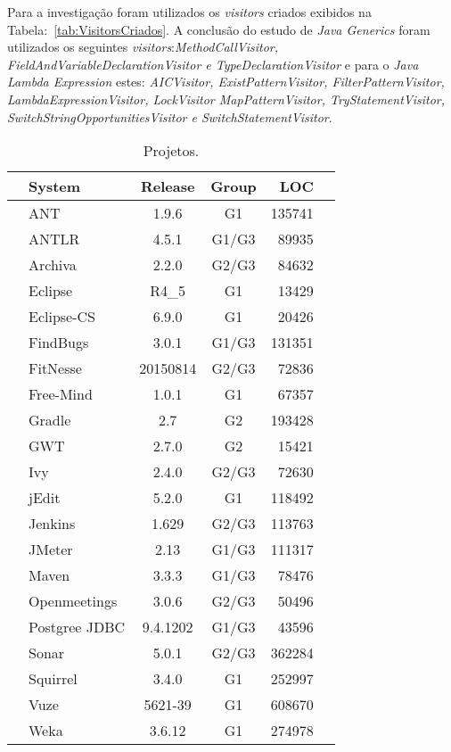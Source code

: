Para a investigação foram utilizados os \textit{visitors} criados exibidos na  Tabela:~\ref{tab:VisitorsCriados}. A conclusão do estudo de \textit{Java Generics} foram utilizados os seguintes \textit{visitors}:\textit{MethodCallVisitor, FieldAndVariableDeclarationVisitor e TypeDeclarationVisitor} e para o \textit{Java Lambda Expression} estes: \textit{AICVisitor, ExistPatternVisitor, FilterPatternVisitor, LambdaExpressionVisitor, LockVisitor  MapPatternVisitor, TryStatementVisitor, SwitchStringOpportunitiesVisitor e SwitchStatementVisitor}.

\newpage

  
\begin{table}[h!]\footnotesize
\centering
	\caption{Projetos.}
	\begin{tabular}{l|lccrr}\hline
		 & \textbf{System} & \textbf{Release} & \textbf{Group}  & \textbf{LOC} \\\hline \hline
		\multirow{22}{*}{\rotatebox[origin=c]{90}{\textbf{Application}}} 
																 & ANT & 1.9.6 & G1 & 135741\\
																 & ANTLR  & 4.5.1 & G1/G3 & 89935 \\
																 & Archiva  & 2.2.0 & G2/G3 & 84632\\
																 & Eclipse & R4\_5 & G1 & 13429\\
																 & Eclipse-CS & 6.9.0 & G1 & 20426\\
																 & FindBugs & 3.0.1 & G1/G3 & 131351\\
																 & FitNesse & 20150814 & G2/G3 & 72836\\
																 & Free-Mind & 1.0.1 & G1 & 67357\\
																 & Gradle & 2.7 & G2 & 193428\\
																 & GWT & 2.7.0 & G2 & 15421\\
																 & Ivy & 2.4.0 & G2/G3 & 72630\\
																 & jEdit & 5.2.0 & G1 & 118492\\
						   									     & Jenkins & 1.629 & G2/G3 & 113763\\
																 & JMeter & 2.13 & G1/G3 & 111317\\
																 & Maven & 3.3.3 & G1/G3 & 78476\\
																 & Openmeetings & 3.0.6 & G2/G3 & 50496\\
																 & Postgree JDBC & 9.4.1202 & G1/G3 & 43596\\ 
																 & Sonar & 5.0.1 & G2/G3 & 362284\\
																 & Squirrel & 3.4.0 & G1 & 252997\\
																 & Vuze & 5621-39 & G1 & 608670\\
																 & Weka & 3.6.12 & G1 & 274978\\
																 \hline
					

\end{tabular}
\end{table}
